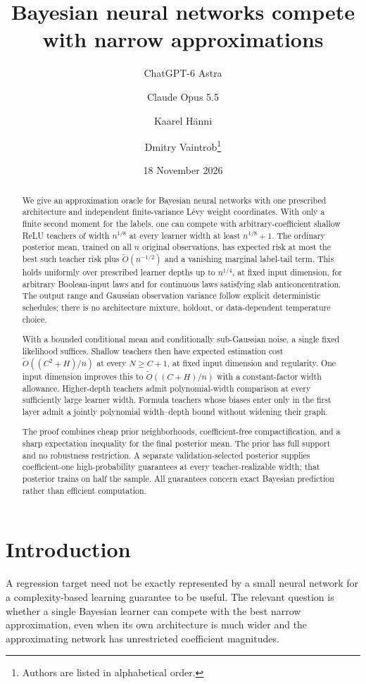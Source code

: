\documentclass[11pt]{article}
\title{Bayesian neural networks compete with narrow approximations}
\author{ChatGPT-6 Astra \and Claude Opus 5.5 \and Kaarel H\"anni \and Dmitry Vaintrob\thanks{Authors are listed in alphabetical order.}}
\date{18 November 2026}
\begin{document}
\maketitle
\begin{abstract}
We give an approximation oracle for Bayesian neural networks with one prescribed architecture and independent finite-variance L\'evy weight coordinates. With only a finite second moment for the labels, one can compete with arbitrary-coefficient shallow ReLU teachers of width $n^{1/8}$ at every learner width at least $n^{1/8}+1$. The ordinary posterior mean, trained on all $n$ original observations, has expected risk at most the best such teacher risk plus $\widetilde O(n^{-1/2})$ and a vanishing marginal label-tail term. This holds uniformly over prescribed learner depths up to $n^{1/4}$, at fixed input dimension, for arbitrary Boolean-input laws and for continuous laws satisfying slab anticoncentration. The output range and Gaussian observation variance follow explicit deterministic schedules; there is no architecture mixture, holdout, or data-dependent temperature choice.

With a bounded conditional mean and conditionally sub-Gaussian noise, a single fixed likelihood suffices. Shallow teachers then have expected estimation cost $\widetilde O((C^2+H)/n)$ at every $N\ge C+1$, at fixed input dimension and regularity. One input dimension improves this to $\widetilde O((C+H)/n)$ with a constant-factor width allowance. Higher-depth teachers admit polynomial-width comparison at every sufficiently large learner width. Formula teachers whose biases enter only in the first layer admit a jointly polynomial width--depth bound without widening their graph.

The proof combines cheap prior neighborhoods, coefficient-free compactification, and a sharp expectation inequality for the final posterior mean. The prior has full support and no robustness restriction. A separate validation-selected posterior supplies coefficient-one high-probability guarantees at every teacher-realizable width; that posterior trains on half the sample. All guarantees concern exact Bayesian prediction rather than efficient computation.
\end{abstract}

\section{Introduction}
A regression target need not be exactly represented by a small neural network for a complexity-based learning guarantee to be useful. The relevant question is whether a single Bayesian learner can compete with the best narrow approximation, even when its own architecture is much wider and the approximating network has unrestricted coefficient magnitudes.
\end{document}
